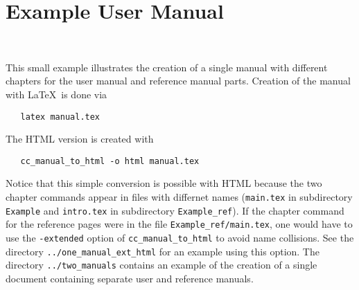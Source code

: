 
\chapter{Example User Manual}
\\

This small example illustrates the creation of a single manual with different
chapters for the user manual and reference manual parts.  Creation of the
manual with \LaTeX\ is done via
\begin{verbatim}
   latex manual.tex
\end{verbatim}
The HTML version is created with
\begin{verbatim}
   cc_manual_to_html -o html manual.tex
\end{verbatim}
Notice that this simple conversion is possible with HTML because the two
chapter commands appear in files with differnet names (\texttt{main.tex} 
in subdirectory \texttt{Example} and \texttt{intro.tex} in subdirectory
\texttt{Example\_ref}).  If the chapter command for the reference pages
were in the file \texttt{Example\_ref/main.tex}, one would have to use
the \texttt{-extended} option of \texttt{cc\_manual\_to\_html} to avoid
name collisions.  See the directory \texttt{../one\_manual\_ext\_html} for an
example using this option.  The directory \texttt{../two\_manuals} contains
an example of the creation of a single document containing separate
user and reference manuals.
